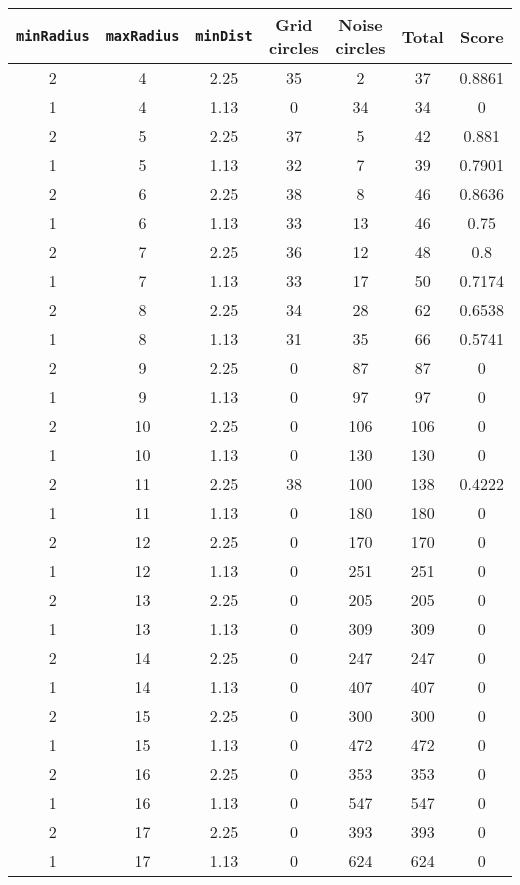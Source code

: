\documentclass[letterpaper, 12pt]{article}
\begin{document}
\begin{longtable}{|c|c|c|c|c|c|c|}
\hline
\textbf{\texttt{minRadius}} & \textbf{\texttt{maxRadius}} & \textbf{\texttt{minDist}} & \textbf{Grid circles} & \textbf{Noise circles} & \textbf{Total} & \textbf{Score} \\
\hline
2 & 4 & 2.25 & 35 & 2 & 37 & 0.8861 \\
\hline
1 & 4 & 1.13 & 0 & 34 & 34 & 0 \\
\hline
2 & 5 & 2.25 & 37 & 5 & 42 & 0.881 \\
\hline
1 & 5 & 1.13 & 32 & 7 & 39 & 0.7901 \\
\hline
2 & 6 & 2.25 & 38 & 8 & 46 & 0.8636 \\
\hline
1 & 6 & 1.13 & 33 & 13 & 46 & 0.75 \\
\hline
2 & 7 & 2.25 & 36 & 12 & 48 & 0.8 \\
\hline
1 & 7 & 1.13 & 33 & 17 & 50 & 0.7174 \\
\hline
2 & 8 & 2.25 & 34 & 28 & 62 & 0.6538 \\
\hline
1 & 8 & 1.13 & 31 & 35 & 66 & 0.5741 \\
\hline
2 & 9 & 2.25 & 0 & 87 & 87 & 0 \\
\hline
1 & 9 & 1.13 & 0 & 97 & 97 & 0 \\
\hline
2 & 10 & 2.25 & 0 & 106 & 106 & 0 \\
\hline
1 & 10 & 1.13 & 0 & 130 & 130 & 0 \\
\hline
2 & 11 & 2.25 & 38 & 100 & 138 & 0.4222 \\
\hline
1 & 11 & 1.13 & 0 & 180 & 180 & 0 \\
\hline
2 & 12 & 2.25 & 0 & 170 & 170 & 0 \\
\hline
1 & 12 & 1.13 & 0 & 251 & 251 & 0 \\
\hline
2 & 13 & 2.25 & 0 & 205 & 205 & 0 \\
\hline
1 & 13 & 1.13 & 0 & 309 & 309 & 0 \\
\hline
2 & 14 & 2.25 & 0 & 247 & 247 & 0 \\
\hline
1 & 14 & 1.13 & 0 & 407 & 407 & 0 \\
\hline
2 & 15 & 2.25 & 0 & 300 & 300 & 0 \\
\hline
1 & 15 & 1.13 & 0 & 472 & 472 & 0 \\
\hline
2 & 16 & 2.25 & 0 & 353 & 353 & 0 \\
\hline
1 & 16 & 1.13 & 0 & 547 & 547 & 0 \\
\hline
2 & 17 & 2.25 & 0 & 393 & 393 & 0 \\
\hline
1 & 17 & 1.13 & 0 & 624 & 624 & 0 \\

\end{longtable}
\end{document}

